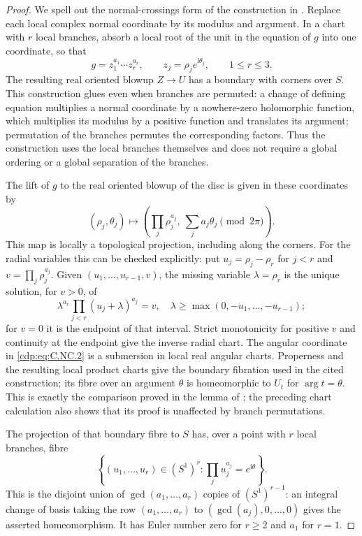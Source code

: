 \begin{proof}
We spell out the normal-crossings form of the construction in \cite[\S2.1--2.2, pp.~237--241]{ACampo1975}. Replace each local complex normal coordinate by its modulus and argument. In a chart with $r$ local branches, absorb a local root of the unit in the equation of $g$ into one coordinate, so that
\[
 g=z_1^{a_1}\cdots z_r^{a_r},\qquad
 z_j=\rho_j e^{\mathrm i\theta_j},\qquad 1\le r\le3.
\]
The resulting real oriented blowup $Z\to U$ has a boundary with corners over $S$. This construction glues even when branches are permuted: a change of defining equation multiplies a normal coordinate by a nowhere-zero holomorphic function, which multiplies its modulus by a positive function and translates its argument; permutation of the branches permutes the corresponding factors. Thus the construction uses the local branches themselves and does not require a global ordering or a global separation of the branches.

The lift of $g$ to the real oriented blowup of the disc is given in these coordinates by
\[
 (\rho_j,\theta_j)\longmapsto
 \left(\prod_j\rho_j^{a_j},\ \sum_j a_j\theta_j\pmod {2\pi}\right).
 \tag{C.NC.2}\label{cdp:eq:C.NC.2}
\]
This map is locally a topological projection, including along the corners. For the radial variables this can be checked explicitly: put $u_j=\rho_j-\rho_r$ for $j<r$ and $v=\prod_j\rho_j^{a_j}$. Given $(u_1,\ldots,u_{r-1},v)$, the missing variable $\lambda=\rho_r$ is the unique solution, for $v>0$, of
\[
 \lambda^{a_r}\prod_{j<r}(u_j+\lambda)^{a_j}=v,
 \quad \lambda\ge\max(0,-u_1,\ldots,-u_{r-1});
\]
for $v=0$ it is the endpoint of that interval. Strict monotonicity for positive $v$ and continuity at the endpoint give the inverse radial chart. The angular coordinate in \eqref{cdp:eq:C.NC.2} is a submersion in local real angular charts. Properness and the resulting local product charts give the boundary fibration used in the cited construction; its fibre over an argument $\theta$ is homeomorphic to $U_t$ for $\arg t=\theta$. This is exactly the comparison proved in the lemma of \cite[\S2.2]{ACampo1975}; the preceding chart calculation also shows that its proof is unaffected by branch permutations.

The projection of that boundary fibre to $S$ has, over a point with $r$ local branches, fibre
\[
 \left\{(u_1,\ldots,u_r)\in(S^1)^r:
             \prod_j u_j^{a_j}=e^{\mathrm i\theta}\right\}.
 \tag{C.NC.3}\label{cdp:eq:C.NC.3}
\]
This is the disjoint union of $\gcd(a_1,\ldots,a_r)$ copies of $(S^1)^{r-1}$: an integral change of basis taking the row $(a_1,\ldots,a_r)$ to $(\gcd(a_j),0,\ldots,0)$ gives the asserted homeomorphism. It has Euler number zero for $r\ge2$ and $a_1$ for $r=1$.


\end{proof}
